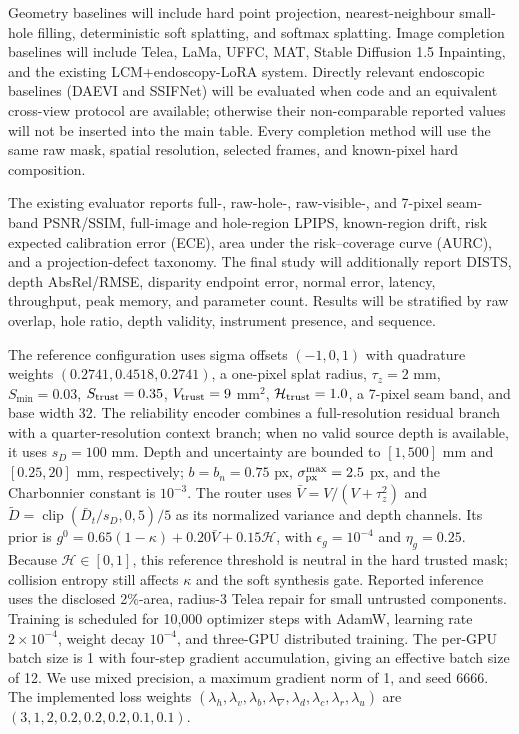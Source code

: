 \documentclass[letterpaper,10pt,conference]{ieeeconf}
\begin{document}
Geometry baselines will include hard point projection, nearest-neighbour
small-hole filling, deterministic soft splatting, and softmax splatting. Image
completion baselines will include Telea, LaMa, UFFC, MAT, Stable Diffusion 1.5
Inpainting, and the existing LCM+endoscopy-LoRA system. Directly relevant
endoscopic baselines (DAEVI and SSIFNet) will be evaluated when code and an
equivalent cross-view protocol are available; otherwise their non-comparable
reported values will not be inserted into the main table. Every completion
method will use the same raw mask, spatial resolution, selected frames, and
known-pixel hard composition.

The existing evaluator reports full-, raw-hole-, raw-visible-, and 7-pixel
seam-band PSNR/SSIM, full-image and hole-region LPIPS, known-region drift, risk
expected calibration error (ECE), area under the risk--coverage curve (AURC),
and a projection-defect taxonomy. The final study will additionally report DISTS, depth AbsRel/RMSE,
disparity endpoint error, normal error, latency, throughput, peak memory, and
parameter count. Results will be stratified by raw overlap, hole ratio, depth
validity, instrument presence, and sequence.

The reference configuration uses sigma offsets $(-1,0,1)$ with quadrature
weights $(0.2741,0.4518,0.2741)$, a one-pixel splat radius,
$\tau_z=2$ mm, $S_{\min}=0.03$, $S_{\rm trust}=0.35$,
$V_{\rm trust}=9$ mm$^2$, $\mathcal H_{\rm trust}=1.0$, a 7-pixel seam band,
and base width 32. The reliability encoder combines a full-resolution residual
branch with a quarter-resolution context branch; when no valid source depth is
available, it uses $s_D=100$ mm. Depth and uncertainty are bounded to $[1,500]$ mm and
$[0.25,20]$ mm, respectively; $b=b_n=0.75$ px,
$\sigma_{\rm px}^{\max}=2.5$ px, and the Charbonnier constant is $10^{-3}$.
The router uses $\bar V=V/(V+\tau_z^2)$ and
$\widetilde D=\operatorname{clip}(\bar D_t/s_D,0,5)/5$ as its normalized
variance and depth channels. Its prior is
$g^0=0.65(1-\kappa)+0.20\bar V+0.15\mathcal H$, with
$\epsilon_g=10^{-4}$ and $\eta_g=0.25$.
Because $\mathcal H\in[0,1]$, this reference threshold is
neutral in the hard trusted mask; collision entropy still affects
$\kappa$ and the soft synthesis gate. Reported inference uses the disclosed
2\%-area, radius-3 Telea repair for small untrusted components. Training is
scheduled for 10,000 optimizer steps with AdamW, learning rate $2\times10^{-4}$,
weight decay $10^{-4}$, and three-GPU distributed training. The per-GPU batch
size is 1 with four-step gradient accumulation, giving an effective batch size
of 12. We use mixed precision, a maximum gradient norm of 1, and seed 6666. The
implemented loss weights
$(\lambda_h,\lambda_v,\lambda_b,\lambda_\nabla,\lambda_d,\lambda_c,
\lambda_r,\lambda_u)$ are $(3,1,2,0.2,0.2,0.2,0.1,0.1)$.
\end{document}
